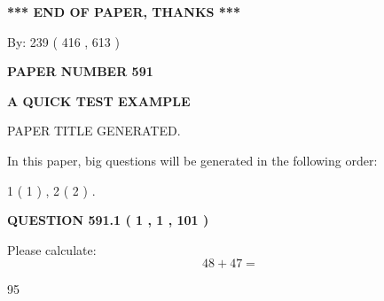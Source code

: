 \documentclass[12pt]{article}
\begin{document}
   
   
   
\vspace{1.0in} 
{\textbf{\large{ *** END OF PAPER, THANKS *** }}} 
   
   
\hspace{1.0in} By: 
 239 ( 416 ,  613 )
   
   
   
   
\newpage 
\setcounter{page}{ 
   591001 } 
   
   
   
   
 {\textbf{ \Large{ PAPER NUMBER  591  }}}
   
   
\vspace{0.2in}
   
   
   
   
   
   
   
   
 \vspace{0.2in}
{\LARGE {\textbf{ A QUICK TEST EXAMPLE}}}
   
   
 PAPER TITLE GENERATED.
   
   
   
\vspace{0.2in}
   
In this paper, big questions will be generated in the following order: 
   
   
   1 ( 1 )
 ,
   2 ( 2 )
 .
  
\vspace{0.2in}
  
{\textbf{\Large{QUESTION
591.1 
 ( 1 , 1 , 101 )
}}}
  
  
 
Please calculate:
\begin{equation}
48 +  %
47 = \nonumber
\end{equation}
 
 
 
\noindent{}
 
 

95
 
 
\noindent{}
 
 

 
 
 
\noindent{}
 
\end{document}

